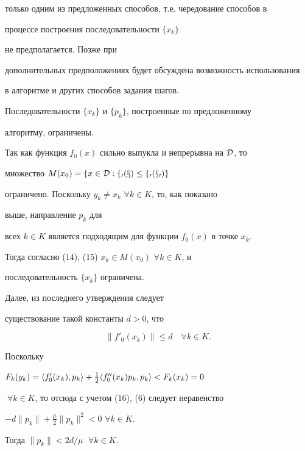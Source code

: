 только одним из предложенных способов, т.е. чередование способов в


процессе построения последовательности $\{x_k\}$


не предполагается. Позже при


дополнительных предположениях будет обсуждена возможность использования


в алгоритме и других способов задания шагов.





\begin{lem}


Последовательности $\{x_k\}$ и $\{p_k\}$, построенные по предложенному


алгоритму, ограничены.


\end{lem}





\begin{pf}


Так как функция $f_0(x)$ сильно выпукла и непрерывна на $\cal D$, то


множество $M(x_0)=\{x\in\cal D:f_0(x)\le f_0(x_0)\}$


ограничено. Поскольку $y_k\ne x_k$ $\forall k\in K$, то, как показано


выше, направление $p_k$ для


всех $k\in K$ является подходящим для функции $f_0(x)$ в точке $x_k$.


Тогда согласно (14), (15) $x_k\in M(x_0)$ $\forall k\in K$, и


последовательность $\{x_k\}$ ограничена.





Далее, из последнего утверждения следует


существование такой константы $d>0$, что


\begin{equation}


\|f'_0(x_k)\|\le d\quad \forall k\in K.


\end{equation}


Поскольку


$F_k(y_k)=\la f'_0(x_k),p_k\ra+\frac{1}{2}\la f''_0(x_k)p_k,p_k\ra<


F_k(x_k)=0$


$\;\forall k\in K$, то отсюда с учетом (16), (6) следует неравенство


$-d\|p_k\|+\frac{\mu}{2}\|p_k\|^2<0$ $\forall k\in K$.


Тогда $\|p_k\|<2d/\mu$ $\;\forall k\in K$.


\end{pf}





